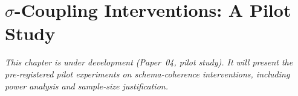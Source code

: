 \chapter{$\sigma$-Coupling Interventions: A Pilot Study}
\label{ch:pilot-study}

\textit{This chapter is under development (Paper~04, pilot study). It will present the
pre-registered pilot experiments on schema-coherence interventions, including power
analysis and sample-size justification.}
